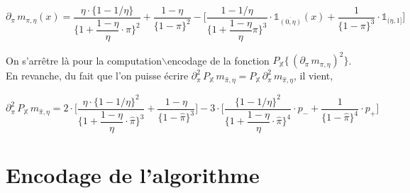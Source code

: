 \documentclass{article}
\begin{document}
    $$ \partial_\pi\, m_{\pi,\eta}(x) = \dfrac{\eta\cdot\{1-1/\eta\} }{\{1+\dfrac{1-\eta}{\eta}\cdot\pi\}^2} + \dfrac{1-\eta}{\{1-\pi\}^2 } - \Big[ \dfrac{1-1/\eta}{\{1+\dfrac{1-\eta}{\eta}\pi\}^3 }\cdot\mathbb{1}_{\overline{(0,\eta)}}(x) + \dfrac{1}{\{1-\pi\}^3}\cdot\mathbb{1}_{(\eta,1]} \Big]  $$

    On s'arrêtre là pour la computation$\backslash$encodage de la fonction $P_\mathbb{X}\{\,(\partial_\pi\,m_{\pi,\eta})^2\}$. \\

    En revanche, du fait que l'on puisse écrire $\partial^2_\pi\,P_\mathbb{X}\,m_{\hat\pi,\eta}  = P_\mathbb{X}\,\partial^2_\pi\,m_{\hat\pi,\eta}$, il vient,

    $$ \partial^2_\pi\,P_\mathbb{X}\,m_{\hat\pi,\eta} =  2\cdot\Big[ \dfrac{\eta\cdot\{1-1/\eta\}^2}{\{1+\dfrac{1-\eta}{\eta}\cdot\hat\pi\}^3} + \dfrac{1-\eta}{\{1-\hat\pi\}^3}\Big] - 3\cdot\Big[ \dfrac{\{1-1/\eta\}^2}{\{1+\dfrac{1-\eta}{\eta}\cdot\hat\pi\}^4}\cdot{}p_- + \dfrac{1}{\{1-\hat\pi\}^4}\cdot{}p_+ \Big]$$ 

    \newpage
    \section{Encodage de l'algorithme}
\end{document}
